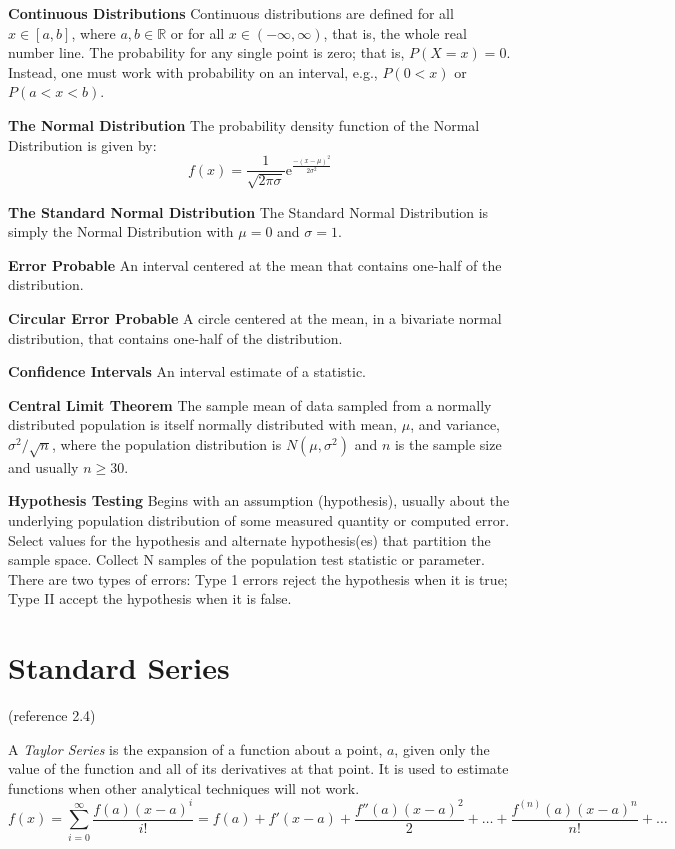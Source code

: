 \documentclass[
]{book}
\begin{document}
\textbf{Continuous Distributions}
Continuous distributions are defined for all \(x \in [a,b]\), where \(a, b \in \mathbb{R}\) or for all \(x \in (-\infty, \infty)\), that is, the whole real number line. The probability for any single point is zero; that is, \(P(X=x) = 0\). Instead, one must work with probability on an interval, e.g., \(P(0 < x)\) or \(P(a < x < b)\).

\textbf{The Normal Distribution}
The probability density function of the Normal Distribution is given by:
\[f(x) = \frac{1}{\sqrt{2 \pi \sigma}}\mathrm{e}^{\frac{-(x-\mu)^2}{2\sigma^2}}\]

\textbf{The Standard Normal Distribution}
The Standard Normal Distribution is simply the Normal Distribution with \(\mu = 0\) and \(\sigma=1\).

\textbf{Error Probable}
An interval centered at the mean that contains one-half of the distribution.

\textbf{Circular Error Probable}
A circle centered at the mean, in a bivariate normal distribution, that contains one-half of the distribution.

\textbf{Confidence Intervals}
An interval estimate of a statistic.

\textbf{Central Limit Theorem}
The sample mean of data sampled from a normally distributed population is itself normally distributed with mean, \(\mu\), and variance, \(\sigma^2/\sqrt{n}\), where the population distribution is \(N(\mu,\sigma^2)\) and \(n\) is the sample size and usually \(n \geq 30\).

\textbf{Hypothesis Testing} Begins with an assumption (hypothesis), usually about the underlying population distribution of some measured quantity or computed error. Select values for the hypothesis and alternate hypothesis(es) that partition the sample space. Collect N samples of the population test statistic or parameter. There are two types of errors: Type 1 errors reject the hypothesis when it is true; Type II accept the hypothesis when it is false.

\hypertarget{standard-series}{%
\section{Standard Series}\label{standard-series}}

(reference 2.4)

A \emph{Taylor Series} is the expansion of a function about a point, \(a\), given only the value of the function and all of its derivatives at that point. It is used to estimate functions when other analytical techniques will not work.
\[f(x) = \sum_{i=0}^{\infty} \frac{{f(a)(x-a)^i}}{i!} = f(a) + f'(x-a) + \frac{f''(a)(x-a)^2}{2} + \dots + \frac{f^{(n)}(a)(x-a)^n}{n!} + \dots\]
\end{document}

